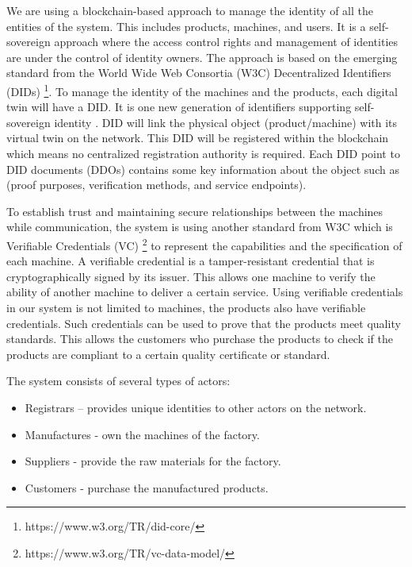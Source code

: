 \documentclass[runningheads]{llncs}
\begin{document}
\noindent
We are using a blockchain-based approach to manage the identity of all the entities of the system. This includes products, machines, and users. It is a self-sovereign approach where the access control rights and management of identities are under the control of identity owners. The approach is based on the emerging standard from the World Wide Web Consortia (W3C) Decentralized Identifiers (DIDs) \footnote{https://www.w3.org/TR/did-core/}. To manage the identity of the machines and the products, each digital twin will have a DID. It is one new generation of identifiers supporting self-sovereign identity \cite{Bartolomeu2019}. DID will link the physical object (product/machine) with its virtual twin on the network. This DID will be registered within the blockchain which means no centralized registration authority is required. Each DID point to DID documents (DDOs) contains some key information about the object such as (proof purposes, verification methods, and service endpoints).
\bigbreak

\noindent
To establish trust and maintaining secure relationships between the machines while communication, the system is using another standard from W3C which is Verifiable Credentials (VC) \footnote{https://www.w3.org/TR/vc-data-model/} to represent the capabilities and the specification of each machine. A verifiable credential is a tamper-resistant credential that is cryptographically signed by its issuer. This allows one machine to verify the ability of another machine to deliver a certain service. Using verifiable credentials in our system is not limited to machines, the products also have verifiable credentials. Such credentials can be used to prove that the products meet quality standards. This allows the customers who purchase the products to check if the products are compliant to a certain quality certificate or standard. 

\bigbreak

\noindent The system consists of several types of actors:
\begin{itemize}
  \item Registrars – provides unique identities to other actors on the network.
  \item Manufactures - own the machines of the factory.
  \item Suppliers - provide the raw materials for the factory.
  \item Customers - purchase the manufactured products.
\end{itemize}
\end{document}
